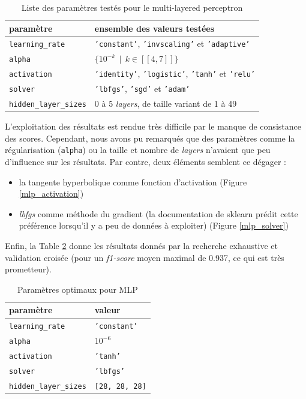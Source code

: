 \documentclass[a4paper]{report}
\begin{document}
\begin{table}[h]
\centering
\begin{tabular}{l l}
paramètre & ensemble des valeurs testées \\
\hline
\texttt{learning\_rate} & \texttt{'constant'}, \texttt{'invscaling'} et \texttt{'adaptive'}\\
\texttt{alpha} & $\{10^{-k} \>\> | \>\> k \in [\![4, 7]\!] \}$ \\
\texttt{activation} & \texttt{'identity'}, \texttt{'logistic'}, \texttt{'tanh'} et \texttt{'relu'} \\
\texttt{solver} &\texttt{'lbfgs'}, \texttt{'sgd'} et \texttt{'adam'}\\
\texttt{hidden\_layer\_sizes} & 0 à 5 \emph{layers}, de taille variant de 1 à 49\\
\end{tabular}
\caption{Liste des paramètres testés pour le multi-layered perceptron\label{params_mlp}}
\end{table}

L'exploitation des résultats est rendue très difficile par le manque de consistance des scores. Cependant, nous avons pu remarqués que des paramètres comme la régularisation (\texttt{alpha}) ou la taille et nombre de \emph{layers} n'avaient que peu d'influence sur les résultats. Par contre, deux éléments semblent ce dégager : \begin{itemize}
\item la tangente hyperbolique comme fonction d'activation (Figure \ref{mlp_activation})
\item \emph{lbfgs} comme méthode du gradient (la documentation de sklearn prédit cette préférence lorsqu'il y a peu de données à exploiter) (Figure \ref{mlp_solver})
\end{itemize}
Enfin, la Table \ref{best_params_mlp} donne les résultats donnés par la recherche exhaustive et validation croisée (pour un \emph{f1-score} moyen maximal de 0.937, ce qui est très prometteur).

\begin{table}[h]
\centering
\begin{tabular}{ll}
paramètre & valeur \\
\hline
\texttt{learning\_rate} & \texttt{'constant'} \\
\texttt{alpha} & \texttt{$10^{-6}$} \\
\texttt{activation} & \texttt{'tanh'} \\
\texttt{solver} & \texttt{'lbfgs'} \\
\texttt{hidden\_layer\_sizes} & \texttt{[28, 28, 28]}\\
\end{tabular}
\caption{Paramètres optimaux pour MLP\label{best_params_mlp}}
\end{table}
\end{document}
